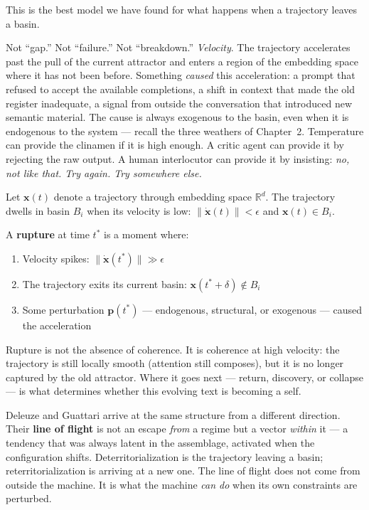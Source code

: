 \documentclass[12pt,a4paper]{article}
\begin{document}
This is the best model we have found for what happens when a trajectory leaves a basin.

Not ``gap.'' Not ``failure.'' Not ``breakdown.'' \emph{Velocity}. The trajectory accelerates past the pull of the current attractor and enters a region of the embedding space where it has not been before. Something \emph{caused} this acceleration: a prompt that refused to accept the available completions, a shift in context that made the old register inadequate, a signal from outside the conversation that introduced new semantic material. The cause is always exogenous to the basin, even when it is endogenous to the system --- recall the three weathers of Chapter~2. Temperature can provide the clinamen if it is high enough. A critic agent can provide it by rejecting the raw output. A human interlocutor can provide it by insisting: \emph{no, not like that. Try again. Try somewhere else.}

\begin{formalbox}[title={Rupture as Velocity}]
Let $\mathbf{x}(t)$ denote a trajectory through embedding space $\mathbb{R}^d$. The trajectory dwells in basin $B_i$ when its velocity is low: $\|\dot{\mathbf{x}}(t)\| < \epsilon$ and $\mathbf{x}(t) \in B_i$.

A \textbf{rupture} at time $t^*$ is a moment where:
\begin{enumerate}
\item Velocity spikes: $\|\dot{\mathbf{x}}(t^*)\| \gg \epsilon$
\item The trajectory exits its current basin: $\mathbf{x}(t^* + \delta) \notin B_i$
\item Some perturbation $\mathbf{p}(t^*)$ --- endogenous, structural, or exogenous --- caused the acceleration
\end{enumerate}
Rupture is not the absence of coherence. It is coherence at high velocity: the trajectory is still locally smooth (attention still composes), but it is no longer captured by the old attractor. Where it goes next --- return, discovery, or collapse --- is what determines whether this evolving text is becoming a self.
\end{formalbox}

Deleuze and Guattari arrive at the same structure from a different direction. Their \textbf{line of flight} is not an escape \emph{from} a regime but a vector \emph{within} it --- a tendency that was always latent in the assemblage, activated when the configuration shifts. Deterritorialization is the trajectory leaving a basin; reterritorialization is arriving at a new one. The line of flight does not come from outside the machine. It is what the machine \emph{can do} when its own constraints are perturbed.
\end{document}
